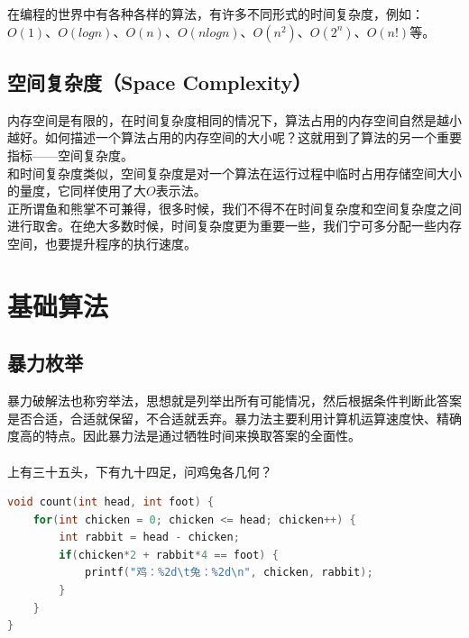 在编程的世界中有各种各样的算法，有许多不同形式的时间复杂度，例如：$ O(1) $、$ O(logn) $、$ O(n) $、$ O(nlogn) $、$ O(n^2) $、$ O(2^n) $、$ O(n!) $等。\\

\subsection{空间复杂度（Space Complexity）}

内存空间是有限的，在时间复杂度相同的情况下，算法占用的内存空间自然是越小越好。如何描述一个算法占用的内存空间的大小呢？这就用到了算法的另一个重要指标——空间复杂度。\\

和时间复杂度类似，空间复杂度是对一个算法在运行过程中临时占用存储空间大小的量度，它同样使用了大$ O $表示法。\\

正所谓鱼和熊掌不可兼得，很多时候，我们不得不在时间复杂度和空间复杂度之间进行取舍。在绝大多数时候，时间复杂度更为重要一些，我们宁可多分配一些内存空间，也要提升程序的执行速度。

\newpage

\section{基础算法}

\subsection{暴力枚举}

暴力破解法也称穷举法，思想就是列举出所有可能情况，然后根据条件判断此答案是否合适，合适就保留，不合适就丢弃。暴力法主要利用计算机运算速度快、精确度高的特点。因此暴力法是通过牺牲时间来换取答案的全面性。\\

\\

上有三十五头，下有九十四足，问鸡兔各几何？

\begin{lstlisting}[language=C]
void count(int head, int foot) {
	for(int chicken = 0; chicken <= head; chicken++) {
		int rabbit = head - chicken;
		if(chicken*2 + rabbit*4 == foot) {
			printf("鸡：%2d\t兔：%2d\n", chicken, rabbit);
		}
	}
}
\end{lstlisting}

\vspace{0.5cm}

\\

